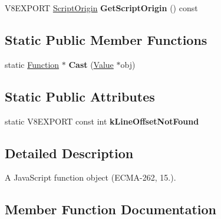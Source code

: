 \begin{DoxyCompactItemize}
\item 
\hypertarget{classv8_1_1_function_a9dfe892a6af9d2799abe3e24e726c0b1}{}V8\+E\+X\+P\+O\+R\+T \hyperlink{classv8_1_1_script_origin}{Script\+Origin} {\bfseries Get\+Script\+Origin} () const \label{classv8_1_1_function_a9dfe892a6af9d2799abe3e24e726c0b1}

\end{DoxyCompactItemize}
\subsection*{Static Public Member Functions}
\begin{DoxyCompactItemize}
\item 
\hypertarget{classv8_1_1_function_af24f38bcc0769519816cda1f6a154ff8}{}static \hyperlink{classv8_1_1_function}{Function} $\ast$ {\bfseries Cast} (\hyperlink{classv8_1_1_value}{Value} $\ast$obj)\label{classv8_1_1_function_af24f38bcc0769519816cda1f6a154ff8}

\end{DoxyCompactItemize}
\subsection*{Static Public Attributes}
\begin{DoxyCompactItemize}
\item 
\hypertarget{classv8_1_1_function_ae8687c89a18c0811d799becfba666406}{}static V8\+E\+X\+P\+O\+R\+T const int {\bfseries k\+Line\+Offset\+Not\+Found}\label{classv8_1_1_function_ae8687c89a18c0811d799becfba666406}

\end{DoxyCompactItemize}


\subsection{Detailed Description}
A Java\+Script function object (E\+C\+M\+A-\/262, 15.). 

\subsection{Member Function Documentation}
\hypertarget{classv8_1_1_function_a81c14d8ec5996630ef56c524b19084c2}{}
